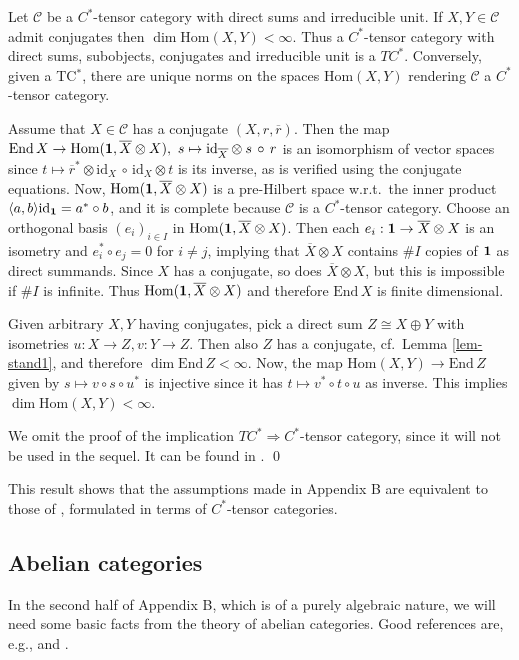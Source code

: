 \documentclass[11pt]{article}
\theoremstyle{definition}
\theoremstyle{definition}
\theoremstyle{remark}
\newcommand{\impl}{\Rightarrow}
\def\2#1{{\mathcal #1}}
\def\1#1{{\bf #1}}
\def\ol#1{{\overline #1}}
\newcommand{\Hom}{\mathrm{Hom}}
\newcommand{\End}{\mathrm{End}}
\newcommand{\mcirc}{\,\circ\,}
\newcommand{\rarr}{\rightarrow}
\def\id{\mathrm{id}}
\begin{document}
\bprop \cite{LR} Let $\2C$ be a $C^*$-tensor category with direct sums and irreducible unit. If $X,Y\in\2C$
admit conjugates then $\dim\Hom(X,Y)<\infty$. Thus a $C^*$-tensor category with direct sums,
subobjects, conjugates and irreducible unit is a $TC^*$. Conversely, given a TC$^*$, there are
unique norms on the spaces $\Hom(X,Y)$ rendering $\2C$ a $C^*$-tensor category. 
\eprop

\prf Assume that $X\in\2C$ has a conjugate $(X,r,\ol{r})$. Then the map
$\End\,X\rarr\Hom(\11,\ol{X}\otimes X),\ s\mapsto\id_{\ol{X}}\otimes s\mcirc r$ is an isomorphism of
vector spaces since $t\mapsto\ol{r}^*\otimes\id_X\mcirc\id_X\otimes t$ is its inverse, as is
verified using the conjugate equations. Now, $\Hom(\11,\ol{X}\otimes X)$ is a pre-Hilbert space w.r.t.\
the inner product $\langle a,b\rangle\id_\11=a^*\circ b$, and it is complete because $\2C$ is a
$C^*$-tensor category. Choose an orthogonal basis $(e_i)_{i\in I}$ in $\Hom(\11,\ol{X}\otimes X)$.
Then each $e_i:\11\rarr\ol{X}\otimes X$ is an isometry and $e_i^*\circ e_j=0$ for $i\ne j$, implying
that $\ol{X}\otimes X$ contains $\#I$ copies of $\11$ as direct summands. Since $X$ has a conjugate,
so does $\ol{X}\otimes X$, but this is impossible if $\#I$ is infinite. Thus 
$\Hom(\11,\ol{X}\otimes X)$ and therefore $\End\,X$ is finite dimensional.

Given arbitrary $X,Y$ having conjugates, pick a direct sum $Z\cong X\oplus Y$ with isometries
$u:X\rarr Z, v:Y\rarr Z$. Then also $Z$ has a conjugate, cf.\ Lemma \ref{lem-stand1}, and therefore
$\dim\End\,Z<\infty$. Now, the map $\Hom(X,Y)\rarr\End\,Z$ given by $s\mapsto v\circ s\circ u^*$ is
injective since it has $t\mapsto v^*\circ t\circ u$ as inverse. This implies $\dim\Hom(X,Y)<\infty$.

We omit the proof of the implication $TC^*\impl C^*$-tensor category, since it will not be used in
the sequel. It can be found in \cite{mue06}.
\qed

This result shows that the assumptions made in Appendix B are equivalent to those of \cite{DR},
formulated  in terms of $C^*$-tensor categories. 




\subsection{Abelian categories} \label{ss-abelian}
In the second half of Appendix B, which is of a purely algebraic nature, we will need some basic
facts from the theory of abelian categories. Good references are, e.g., \cite{gab} and \cite[Chapter
VIII]{cwm}.
\end{document}

